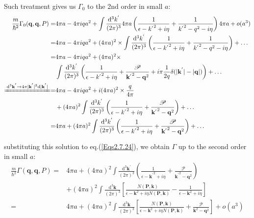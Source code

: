 Such treatment gives us $\Gamma_0$ to the 2nd order in small $a$:
\[ \begin{split} \frac{m}{\hbar^2} \Gamma_0(\mathbf{q},\mathbf{q},P) =& 4\pi a - 4\pi i q a^2 + \int \frac{\mathrm{d}^3 k^{'}}{(2\pi)^3} 4\pi a \left( \frac{1}{\epsilon-{k^{'}}^2 + i \eta} + \frac{1}{{k^{'}}^2-q^2-i \eta} \right)4\pi a + o(a^3)\\
=& 4\pi a - 4\pi i q a^2 + (4\pi a)^2 \times \int \frac{\mathrm{d}^3 k^{'}}{(2\pi)^3} \left( \frac{1}{\epsilon-{k^{'}}^2 + i \eta} + \frac{1}{{k^{'}}^2-q^2-i \eta} \right) + \ldots\\
=& 4\pi a - 4\pi i q a^2 + (4\pi a)^2 \times\\
&\int \frac{\mathrm{d}^3 k^{'}}{(2\pi)^3} \left( \frac{1}{\epsilon-{k^{'}}^2 + i \eta} + \frac{\mathscr{P}}{{\mathbf{k}^{'}}^2-\mathbf{q}^2} + i \pi \frac{1}{2q} \delta(|\mathbf{k}^{'}|-|\mathbf{q}|) \right) + \ldots\\
\xlongequal{\mathrm{d}^3 \mathbf{k}^{'} \rightarrow 4\pi |\mathbf{k}^{'}|^2 \mathrm{d} |\mathbf{k}^{'}|}
=&4\pi a - 4\pi i q a^2+ i (4\pi a)^2 \times \frac{q}{4\pi}
\\&+ (4\pi a)^2\int \frac{\mathrm{d}^3 k^{'}}{(2\pi)^3} \left( \frac{1}{\epsilon-{k^{'}}^2 + i \eta} + \frac{\mathscr{P}}{{\mathbf{k}^{'}}^2-\mathbf{q}^2} \right) + \ldots\\
=&4\pi a + (4\pi a)^2\int \frac{\mathrm{d}^3 k^{'}}{(2\pi)^3} \left( \frac{1}{\epsilon-{k^{'}}^2 + i \eta} + \frac{\mathscr{P}}{{\mathbf{k}^{'}}^2-\mathbf{q}^2} \right) + \ldots
\end{split} \]

substituting this solution to eq.(\ref{Eqs2.7.24}), we obtain $\Gamma$ up to the second order in small $a$:
\begin{equation} \label{Eqs2.7.26} \begin{split}
\frac{m}{\hbar^2}\Gamma(\mathbf{q},\mathbf{q},P) =& 4\pi a + (4\pi a)^2 \int \frac{\mathrm{d}^3 \mathbf{k}^{'}}{(2\pi)^3} \left( \frac{1}{\epsilon-{\mathbf{k}^{'}}^2 + i \eta} + \frac{\mathscr{P}}{{\mathbf{k}^{'}}^2-\mathbf{q}^2} \right)\\
&+ (4\pi a)^2 \int \frac{\mathrm{d}^3 \mathbf{k}}{(2\pi)^3} \left[ \frac{N(\mathbf{P},\mathbf{k})}{\epsilon-\mathbf{k}^2+i \eta N(\mathbf{P},\mathbf{k})} - \frac{1}{\epsilon-{\mathbf{k}}^2 + i \eta} \right]\\
=& 4\pi a + (4\pi a)^2 \int \frac{\mathrm{d}^3 \mathbf{k}}{(2\pi)^3}\left[ \frac{N(\mathbf{P},\mathbf{k})}{\epsilon-\mathbf{k}^2+i \eta N(\mathbf{P},\mathbf{k})} + \frac{\mathscr{P}}{{\mathbf{k}}^2-\mathbf{q}^2} \right] + o(a^3)
\end{split} \end{equation}

